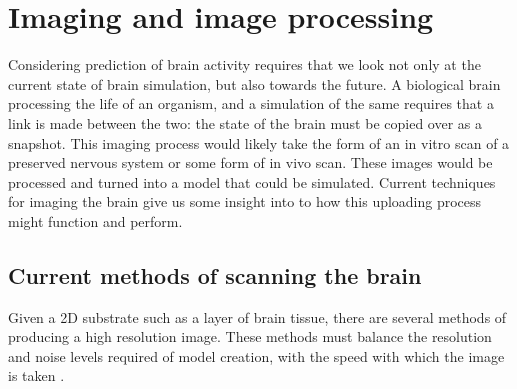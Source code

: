 \section{Imaging and image processing}

Considering prediction of brain activity requires that we look not only at the
current state of brain simulation, but also towards the future. A biological
brain processing the life of an organism, and a simulation of the same requires
that a link is made between the two: the state of the brain must be copied over as a
snapshot. This imaging process would likely take the form of an in vitro scan of
a preserved nervous system or some form of in vivo scan. These images would be
processed and turned into a model that could be simulated. Current techniques for imaging the brain give us some insight into to how this
uploading process might function and perform.

\subsection{Current methods of scanning the brain}

Given a 2D substrate such as a layer of brain tissue, there are several methods
of producing a high resolution image. These methods must balance the resolution
and noise levels required of model creation, with the speed with which the image
is taken \autocite{bostrom_whole_2008,mikula_progress_2016}.

